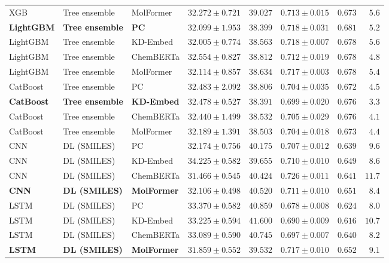\documentclass{article}
\begin{document}
\begin{table}[!ht]
{\begin{tabular}{lllccccr}
XGB & Tree ensemble & MolFormer & $32.272 \pm 0.721$ & $39.027$ & $0.713 \pm 0.015$ & $0.673$ & $5.6$ \\
\textbf{LightGBM} & \textbf{Tree ensemble} & \textbf{PC} & $\mathbf{32.099 \pm 1.953}$ & $\mathbf{38.399}$ & $\mathbf{0.718 \pm 0.031}$ & $\mathbf{0.681}$ & $\mathbf{5.2}$ \\
LightGBM & Tree ensemble & KD-Embed & $32.005 \pm 0.774$ & $38.563$ & $0.718 \pm 0.007$ & $0.678$ & $5.6$ \\
LightGBM & Tree ensemble & ChemBERTa & $32.554 \pm 0.827$ & $38.812$ & $0.712 \pm 0.019$ & $0.678$ & $4.8$ \\
LightGBM & Tree ensemble & MolFormer & $32.114 \pm 0.857$ & $38.634$ & $0.717 \pm 0.003$ & $0.678$ & $5.4$ \\
CatBoost & Tree ensemble & PC & $32.483 \pm 2.092$ & $38.806$ & $0.704 \pm 0.035$ & $0.672$ & $4.5$ \\
\textbf{CatBoost} & \textbf{Tree ensemble} & \textbf{KD-Embed} & $\mathbf{32.478 \pm 0.527}$ & $\mathbf{38.391}$ & $\mathbf{0.699 \pm 0.020}$ & $\mathbf{0.676}$ & $\mathbf{3.3}$ \\
CatBoost & Tree ensemble & ChemBERTa & $32.440 \pm 1.499$ & $38.532$ & $0.705 \pm 0.029$ & $0.676$ & $4.1$ \\
CatBoost & Tree ensemble & MolFormer & $32.189 \pm 1.391$ & $38.503$ & $0.704 \pm 0.018$ & $0.673$ & $4.4$ \\
\midrule
CNN & DL (SMILES) & PC & $32.174 \pm 0.756$ & $40.175$ & $0.707 \pm 0.012$ & $0.639$ & $9.6$ \\
CNN & DL (SMILES) & KD-Embed & $34.225 \pm 0.582$ & $39.655$ & $0.710 \pm 0.010$ & $0.649$ & $8.6$ \\
CNN & DL (SMILES) & ChemBERTa & $31.466 \pm 0.545$ & $40.424$ & $0.726 \pm 0.011$ & $0.641$ & $11.7$ \\
\textbf{CNN} & \textbf{DL (SMILES)} & \textbf{MolFormer} & $\mathbf{32.106 \pm 0.498}$ & $\mathbf{40.520}$ & $\mathbf{0.711 \pm 0.010}$ & $\mathbf{0.651}$ & $\mathbf{8.4}$ \\
LSTM & DL (SMILES) & PC & $33.370 \pm 0.582$ & $40.859$ & $0.678 \pm 0.008$ & $0.624$ & $8.0$ \\
LSTM & DL (SMILES) & KD-Embed & $33.225 \pm 0.594$ & $41.600$ & $0.690 \pm 0.009$ & $0.616$ & $10.7$ \\
LSTM & DL (SMILES) & ChemBERTa & $33.089 \pm 0.590$ & $40.745$ & $0.697 \pm 0.007$ & $0.640$ & $8.2$ \\
\textbf{LSTM} & \textbf{DL (SMILES)} & \textbf{MolFormer} & $\mathbf{31.859 \pm 0.552}$ & $\mathbf{39.532}$ & $\mathbf{0.717 \pm 0.010}$ & $\mathbf{0.652}$ & $\mathbf{9.1}$ \\

\end{tabular}}
\end{table}
\end{document}
